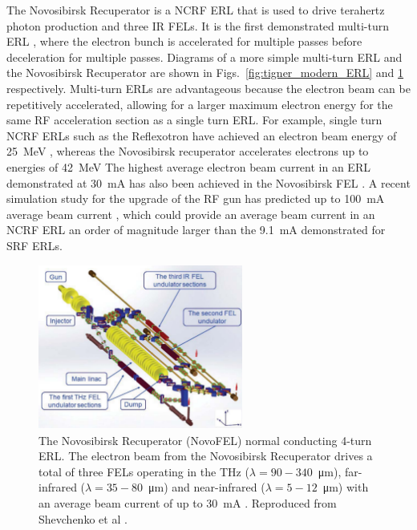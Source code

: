 \documentclass[../main.tex]{subfiles}
\begin{document}
The Novosibirsk Recuperator is a NCRF ERL that is used to drive terahertz photon production and three IR FELs. It is the first demonstrated multi-turn ERL \cite{gavrilov2007status}, where the electron bunch is accelerated for multiple passes before deceleration for multiple passes. Diagrams of a more simple multi-turn ERL and the Novosibirsk Recuperator are shown in Figs.~\ref{fig:tigner_modern_ERL} and \ref{fig:novosibirsk_recuperator} respectively. Multi-turn ERLs are advantageous because the electron beam can be repetitively accelerated, allowing for a larger maximum electron energy for the same RF acceleration section as a single turn ERL. For example, single turn NCRF ERLs such as the Reflexotron have achieved an electron beam energy of 25~\si{\mega\electronvolt} \cite{schriber1977experimental}, whereas the Novosibirsk recuperator accelerates electrons up to energies of 42~\si{\mega\electronvolt} \cite{shevchenko2020novosibirsk}  The highest average electron beam current in an ERL demonstrated at 30~\si{\milli\ampere} has also been achieved in the Novosibirsk FEL \cite{gavrilov2007status}. A recent simulation study for the upgrade of the RF gun has predicted up to 100~\si{\milli\ampere} average beam current \cite{matveev2020simulation}, which could provide an average beam current in an NCRF ERL an order of magnitude larger than the 9.1~\si{\milli\ampere} \cite{neil2006jlab} demonstrated for SRF ERLs.  
\begin{figure}[!h]
\centering
\includegraphics[width=0.6\textwidth]{Figures/Introduction/Novosibirsk_Recuperator.pdf}
\caption{The Novosibirsk Recuperator (NovoFEL) normal conducting 4-turn ERL. The electron beam from the Novosibirsk Recuperator drives a total of three FELs operating in the \si{\tera\hertz} ($\lambda = 90-340$~\si{\micro\meter}), far-infrared ($\lambda = 35 - 80$~\si{\micro\meter}) and near-infrared ($\lambda = 5 - 12$~\si{\micro\meter}) \cite{shevchenko2020novosibirsk} with an average beam current of up to 30~\si{\milli\ampere} \cite{gavrilov2007status}. Reproduced from Shevchenko et al \cite{shevchenko2020novosibirsk}. }
\label{fig:novosibirsk_recuperator}
\end{figure}
\end{document}

